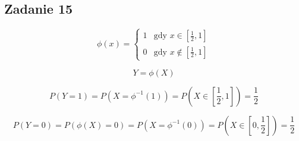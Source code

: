 \subsection{Zadanie 15}

$$
\phi(x) =
\left\{ \begin{array}{ll}
1 & \text{gdy } x \in [\frac{1}{2},1]\\
0 & \text{gdy } x \notin [\frac{1}{2},1]
\end{array} \right.
$$

$$
Y = \phi(X)
$$

$$
P(Y = 1) = P(X = \phi^{-1}(1)) = P(X \in [\frac{1}{2},1]) = \frac{1}{2}
$$

$$
P(Y = 0) = P(\phi(X) = 0) = P(X = \phi^{-1}(0)) = P(X \in [0,\frac{1}{2}]) = \frac{1}{2}
$$
